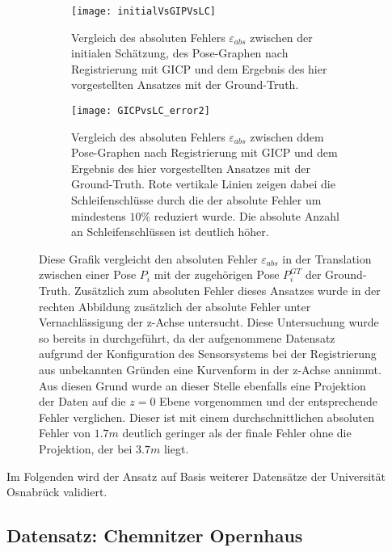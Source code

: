 \begin{figure}
	\centering
	\begin{subfigure}{.5\textwidth}
		 \centering
  		 \texttt{[image: initialVsGIPVsLC]}
  		 \centering \caption{Vergleich des absoluten Fehlers $\varepsilon_{abs}$ zwischen der initialen Schätzung, des Pose-Graphen nach Registrierung mit GICP und dem Ergebnis des hier vorgestellten Ansatzes mit der Ground-Truth.}
  		 \label{fig:initialVsGIPVsLC}
	\end{subfigure}%
	\begin{subfigure}{.5\textwidth}
    	\centering
  		\texttt{[image: GICPvsLC\_error2]}
  		\centering \caption{Vergleich des absoluten Fehlers $\varepsilon_{abs}$ zwischen ddem Pose-Graphen nach Registrierung mit GICP und dem Ergebnis des hier vorgestellten Ansatzes mit der Ground-Truth. Rote vertikale Linien zeigen dabei die Schleifenschlüsse durch die der absolute Fehler um mindestens $10\%$ reduziert wurde. Die absolute Anzahl an Schleifenschlüssen ist deutlich höher.}
  		\label{fig:GICPvsLC_error2}
	\end{subfigure}
	\caption{Diese Grafik vergleicht den absoluten Fehler $\varepsilon_{abs}$ in der Translation zwischen einer Pose $P_i$ mit der zugehörigen Pose $P_i^{GT}$ der Ground-Truth. Zusätzlich zum absoluten Fehler dieses Ansatzes wurde in der rechten Abbildung zusätzlich der absolute Fehler unter Vernachlässigung der z-Achse untersucht. Diese Untersuchung wurde so bereits in \cite{sprickerhof2011heuristic} durchgeführt, da der aufgenommene Datensatz aufgrund der Konfiguration des Sensorsystems bei der Registrierung aus unbekannten Gründen eine Kurvenform in der z-Achse annimmt. Aus diesen Grund wurde an dieser Stelle ebenfalls eine Projektion der Daten auf die $z=0$ Ebene vorgenommen und der entsprechende Fehler verglichen. Dieser ist mit einem durchschnittlichen absoluten Fehler von $1.7m$ deutlich geringer als der finale Fehler ohne die Projektion, der bei $3.7m$ liegt.}
	\label{fig:Han1Error}
\end{figure}

Im Folgenden wird der Ansatz auf Basis weiterer Datensätze der Universität Osnabrück validiert.

\subsection{Datensatz: Chemnitzer Opernhaus}

